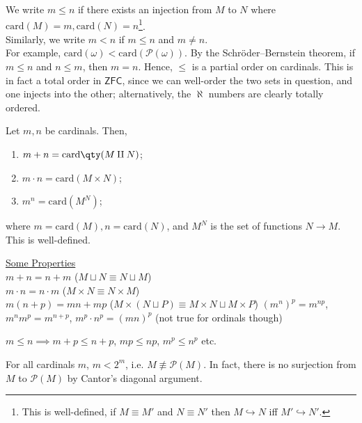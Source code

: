 We write $m \leq n$ if there exists an injection from $M$ to $N$ where $\mathrm{card}(M) = m, \mathrm{card}(N) = n$\footnote{This is well-defined, if $M \equiv M'$ and $N \equiv N'$ then $M \hookrightarrow N$ iff $M' \hookrightarrow N'$.}. \\
Similarly, we write $m < n$ if $m \leq n$ and $m \neq n$. \\
For example, $\mathrm{card}(\omega) < \mathrm{card}(\mathcal P(\omega))$.
By the Schr\"oder--Bernstein theorem, if $m \leq n$ and $n \leq m$, then $m = n$.
Hence, $\leq$ is a partial order on cardinals.
This is in fact a total order in $\mathsf{ZFC}$, since we can well-order the two sets in question, and one injects into the other; alternatively, the $\aleph$ numbers are clearly totally ordered.

Let $m, n$ be cardinals.
Then,
\begin{enumerate}
    \item $m + n = \mathrm{card}\qty(M \amalg N)$;
    \item $m \cdot n = \mathrm{card}(M \times N)$;
    \item $m^n = \mathrm{card}(M^N)$;
\end{enumerate}
where $m = \mathrm{card}(M), n = \mathrm{card}(N)$, and $M^N$ is the set of functions $N \to M$.
This is well-defined.

\underline{Some Properties} \\
$m + n = n + m$ ($M \sqcup N \equiv N \sqcup M$) \\
$m \cdot n = n \cdot m$ ($M \times N \equiv N \times M$) \\
$m (n + p) = mn + mp$ ($M \times (N \sqcup P) \equiv M \times N \sqcup M \times P$)
$(m^n)^p = m^{np}$, $m^n m^p = m^{n + p}$, $m^p \cdot n^p = (mn)^p$ (not true for ordinals though)

$m \leq n \implies m + p \leq n + p$, $mp \leq np$, $m^p \leq n^p$ etc.

\begin{note}
    For all cardinals $m$, $m < 2^m$, i.e. $M \not\equiv \mathcal{P}(M)$.
    In fact, there is no surjection from $M$ to $\mathcal{P}(M)$ by Cantor's diagonal argument.
\end{note}


